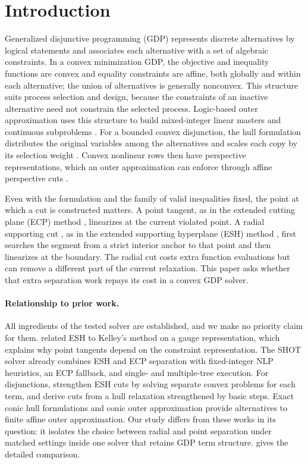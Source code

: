 \section{Introduction}\label{sec:introduction}
Generalized disjunctive programming (GDP) represents discrete alternatives by logical statements and associates each alternative with a set of algebraic constraints. In a convex minimization GDP, the objective and inequality functions are convex and equality constraints are affine, both globally and within each alternative; the union of alternatives is generally nonconvex. This structure suits process selection and design, because the constraints of an inactive alternative need not constrain the selected process. Logic-based outer approximation uses this structure to build mixed-integer linear masters and continuous subproblems \citep{turkay1996}. For a bounded convex disjunction, the hull formulation distributes the original variables among the alternatives and scales each copy by its selection weight \citep{balas1998,ceria1999,grossmann2003}. Convex nonlinear rows then have perspective representations, which an outer approximation can enforce through affine perspective cuts \citep{frangioni2006,bestuzheva2023}.

Even with the formulation and the family of valid inequalities fixed, the point at which a cut is constructed matters. A point tangent, as in the extended cutting plane (ECP) method \citep{westerlund1995}, linearizes at the current violated point. A radial supporting cut \citep{veinott1967}, as in the extended supporting hyperplane (ESH) method \citep{kronqvist2016}, first searches the segment from a strict interior anchor to that point and then linearizes at the boundary. The radial cut costs extra function evaluations but can remove a different part of the current relaxation. This paper asks whether that extra separation work repays its cost in a convex GDP solver.

\paragraph{Relationship to prior work.}
All ingredients of the tested solver are established, and we make no priority claim for them. \citet{serrano2020} related ESH to Kelley's method on a gauge representation, which explains why point tangents depend on the constraint representation. The SHOT solver \citep{lundell2022} already combines ESH and ECP separation with fixed-integer NLP heuristics, an ECP fallback, and single- and multiple-tree execution. For disjunctions, \citet{kronqvist2021} strengthen ESH cuts by solving separate convex problems for each term, and \citet{trespalacios2016} derive cuts from a hull relaxation strengthened by basic steps. Exact conic hull formulations \citep{bernal2024,gusev2026} and conic outer approximation \citep{coey2020} provide alternatives to finite affine outer approximation. Our study differs from these works in its question: it isolates the choice between radial and point separation under matched settings inside one solver that retains GDP term structure.  gives the detailed comparison.

